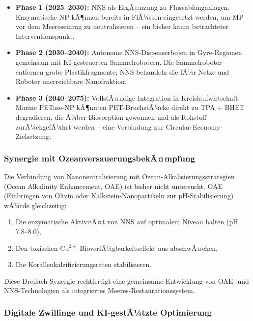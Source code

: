 ﻿\documentclass[12pt,a4paper]{article}
\theoremstyle{definition}
\theoremstyle{remark}
\begin{document}
\begin{itemize}
  \item \textbf{Phase 1 (2025--2030):} NNS als ErgÃ¤nzung zu Flussabfanganlagen.
        Enzymatische NP kÃ¶nnen bereits in FlÃ¼ssen eingesetzt werden, um
        MP vor dem Meereseinrag zu neutralisieren -- ein bisher kaum
        betrachteter Interventionspunkt.
  \item \textbf{Phase 2 (2030--2040):} Autonome NNS-Dispenserbojen in Gyre-Regionen
        gemeinsam mit KI-gesteuerten Sammelrobotern. Die Sammelroboter
        entfernen grobe Plastikfragmente; NNS behandeln die fÃ¼r Netze und
        Roboter unerreichbare Nanofraktion.
  \item \textbf{Phase 3 (2040--2075):} VollstÃ¤ndige Integration in Kreislaufwirtschaft.
        Marine PETase-NP kÃ¶nnten PET-BruchstÃ¼cke direkt zu
        TPA + BHET degradieren, die Ã¼ber Biosorption gewonnen und
        als Rohstoff zurÃ¼ckgefÃ¼hrt werden -- eine Verbindung zur
        Circular-Economy-Zielsetzung.
\end{itemize}

\subsubsection{Synergie mit OzeanversauerungsbekÃ¤mpfung}

Die Verbindung von Nanoneutralisierung mit Ozean-Alkalisierungsstrategien
(Ocean Alkalinity Enhancement, OAE) ist bisher nicht untersucht. OAE
(Einbringen von Olivin oder Kalkstein-Nanopartikeln zur pH-Stabilisierung)
wÃ¼rde gleichzeitig:
\begin{enumerate}
  \item Die enzymatische AktivitÃ¤t von NNS auf optimalem Niveau halten (pH 7.8--8.0),
  \item Den toxischen Cu$^{2+}$-BioverfÃ¼gbarkeitseffekt aus \cite{ocnscnce_epp2026}
        abschwÃ¤chen,
  \item Die Korallenkalzifizierungsraten stabilisieren.
\end{enumerate}

Diese Dreifach-Synergie rechtfertigt eine gemeinsame Entwicklung von
OAE- und NNS-Technologien als integriertes Meeres-Restaurationssystem.

\subsubsection{Digitale Zwillinge und KI-gestÃ¼tzte Optimierung}
\end{document}

